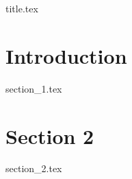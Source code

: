 \documentclass[12pt,a4paper]{article}
\begin{document}
{title.tex}

\tableofcontents
\clearpage

\section{Introduction}
{section_1.tex}
\pagebreak

\section{Section 2}
{section_2.tex}
\pagebreak
\end{document}
